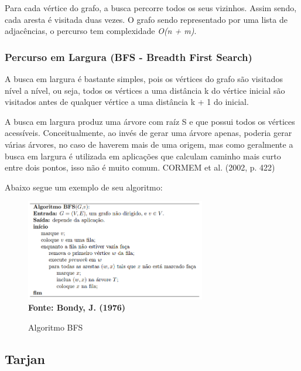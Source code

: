 Para cada vértice do grafo, a busca percorre todos os seus vizinhos. Assim sendo, cada aresta é visitada duas vezes.
O grafo sendo representado por uma lista de adjacências, o percurso tem
complexidade \emph{O(n + m)}.

\subsubsection{\esp Percurso em Largura (BFS - Breadth First Search)}

A busca em largura é bastante simples, pois os vértices do grafo são visitados nível a nível, ou seja, todos os vértices a uma distância k do vértice inicial são visitados antes de qualquer vértice a uma distância k + 1 do inicial.

A busca em largura produz uma árvore com raíz S e que possui todos os vértices acessíveis. Conceitualmente, ao invés de gerar uma árvore apenas, poderia gerar várias árvores, no caso de haverem mais de uma origem, mas como geralmente a busca em largura é utilizada em aplicações que calculam caminho mais curto entre dois pontos, isso não é muito comum. CORMEM et al. (2002, p. 422)

Abaixo segue um exemplo de seu algoritmo:

\begin{figure}[ht]
	\centering	
	\caption[\hspace{0.1cm}Algoritmo BFS.]{Algoritmo BFS}
	\vspace{-0.4cm}
	\includegraphics[width=0.7\textwidth]{figuras/bfs.png}
	 \vspace{-0.2cm}
	\\\textbf{\footnotesize Fonte:  Bondy, J. (1976)}
	\label{fig:figura1}
\end{figure}

\vspace{2cm}
\subsection{\esp Tarjan}

